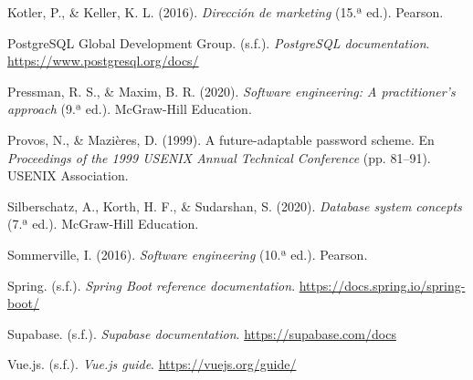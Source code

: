 \documentclass[stu,12pt,letterpaper,donotrepeattitle,floatsintext]{apa7}
\begin{document}
Kotler, P., \& Keller, K. L. (2016). \textit{Dirección de marketing} (15.ª ed.). Pearson.

PostgreSQL Global Development Group. (s.f.). \textit{PostgreSQL documentation}. \url{https://www.postgresql.org/docs/}

Pressman, R. S., \& Maxim, B. R. (2020). \textit{Software engineering: A practitioner’s approach} (9.ª ed.). McGraw-Hill Education.

Provos, N., \& Mazières, D. (1999). A future-adaptable password scheme. En \textit{Proceedings of the 1999 USENIX Annual Technical Conference} (pp. 81–91). USENIX Association.

Silberschatz, A., Korth, H. F., \& Sudarshan, S. (2020). \textit{Database system concepts} (7.ª ed.). McGraw-Hill Education.

Sommerville, I. (2016). \textit{Software engineering} (10.ª ed.). Pearson.

Spring. (s.f.). \textit{Spring Boot reference documentation}. \url{https://docs.spring.io/spring-boot/}

Supabase. (s.f.). \textit{Supabase documentation}. \url{https://supabase.com/docs}

Vue.js. (s.f.). \textit{Vue.js guide}. \url{https://vuejs.org/guide/}

\endgroup
\end{document}
